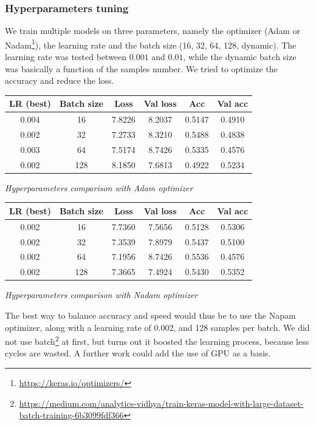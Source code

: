\documentclass[10pt,conference,compsocconf]{IEEEtran}
\begin{document}
\subsubsection{Hyperparameters tuning}
We train multiple models on three parameters, namely the optimizer (Adam or Nadam\footnote{\url{https://keras.io/optimizers/}}), the learning rate and the batch size (16, 32, 64, 128, dynamic). The learning rate was tested between $0.001$ and $0.01$, while the dynamic batch size was basically a function of the samples number. We tried to optimize the accuracy and reduce the loss.

\begin{table}[]
\centering
\begin{tabular}{|c|c||c|c|c|c|}
\hline
\textbf{LR (best)} & \textbf{Batch size} & \textbf{Loss} & \textbf{Val loss} & \textbf{Acc} & \textbf{Val acc} \\ \hline\hline
0.004&16&7.8226&8.2037&0.5147&0.4910\\ \hline
0.002&32&7.2733&8.3210&0.5488&0.4838\\ \hline
0.003&64&7.5174&8.7426&0.5335&0.4576\\ \hline
0.002&128&8.1850&7.6813&0.4922&0.5234\\ \hline
\end{tabular}
\textit{Hyperparameters comparison with Adam optimizer}
\end{table}
\begin{table}[]
\centering
\begin{tabular}{|c|c||c|c|c|c|}
\hline
\textbf{LR (best)} & \textbf{Batch size} & \textbf{Loss} & \textbf{Val loss} & \textbf{Acc} & \textbf{Val acc} \\ \hline\hline
0.002&16&7.7360&7.5656&0.5128&0.5306\\ \hline
0.002&32&7.3539&7.8979&0.5437&0.5100\\ \hline
0.002&64&7.1956&8.7426&0.5536&0.4576\\ \hline
0.002&128&7.3665&7.4924&0.5430&0.5352\\ \hline
\end{tabular}
\textit{Hyperparameters comparison with Nadam optimizer}
\end{table}

The best way to balance accuracy and speed would thus be to use the Napam optimizer, along with a learning rate of 0.002, and 128 samples per batch. We did not use batch\footnote{\url{https://medium.com/analytics-vidhya/train-keras-model-with-large-dataset-batch-training-6b3099fdf366}} at first, but turns out it boosted the learning process, because less cycles are wasted. A further work could add the use of GPU as a basis.
\end{document}
